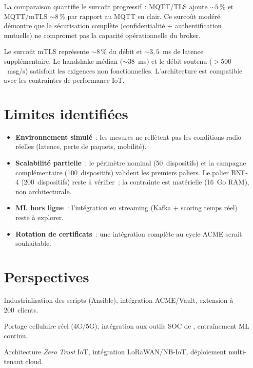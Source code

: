 La comparaison quantifie le surcoût progressif~: MQTT/TLS ajoute $\sim 5$\,\% et MQTT/mTLS $\sim 8$\,\% par rapport au MQTT en clair. Ce surcoût modéré démontre que la sécurisation complète (confidentialité + authentification mutuelle) ne compromet pas la capacité opérationnelle du broker.

\begin{resultbox}
Le surcoût mTLS représente $\sim 8$\,\% du débit et $\sim 3{,}5$~ms de latence supplémentaire. Le handshake médian ($\sim 38$~ms) et le débit soutenu ($>500$~msg/s) satisfont les exigences non fonctionnelles. L'architecture est compatible avec les contraintes de performance IoT.
\end{resultbox}

\section{Limites identifiées}
\label{sec:tc-limites}

\begin{itemize}[leftmargin=*]
  \item \textbf{Environnement simulé}~: les mesures ne reflètent pas les conditions radio réelles (latence, perte de paquets, mobilité).
  \item \textbf{Scalabilité partielle}~: le périmètre nominal (50~dispositifs) et la campagne complémentaire (100~dispositifs) valident les premiers paliers. Le palier BNF-4 (200~dispositifs) reste à vérifier~; la contrainte est matérielle (16~Go RAM), non architecturale.
  \item \textbf{ML hors ligne}~: l'intégration en streaming (Kafka + scoring temps réel) reste à explorer.
  \item \textbf{Rotation de certificats}~: une intégration complète au cycle ACME serait souhaitable.
\end{itemize}

\section{Perspectives}
\label{sec:tc-perspectives}

\begin{description}[leftmargin=*]
  \item[Court terme ($<$~3~mois)] Industrialisation des scripts (Ansible), intégration ACME/Vault, extension à 200~clients.
  \item[Moyen terme (3--12~mois)] Portage cellulaire réel (4G/5G), intégration aux outils SOC de \TT{}, entraînement ML continu.
  \item[Long terme ($>$~12~mois)] Architecture \emph{Zero Trust} IoT, intégration LoRaWAN/NB-IoT, déploiement multi-tenant cloud.
\end{description}

